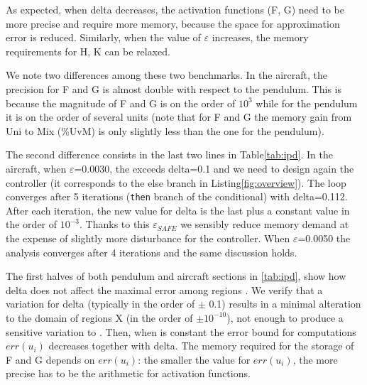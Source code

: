 
As expected, when delta decreases, the activation functions (F, G) need to be
more precise and require more memory, because the space for approximation error
is reduced. Similarly, when the value of $\varepsilon$ increases, the memory
requirements for H, K can be relaxed.

We note two differences among these two benchmarks.
In the aircraft,
the precision for F and G is almost double with respect to the pendulum. This is
because the magnitude of F and G is on the order of $10^{3}$ while for the
pendulum it is on the order of several units (note that for F and G the memory gain
from Uni to Mix (\%UvM) is only slightly less than the one for the pendulum).

The second difference consists in the last two lines in Table\ref{tab:ipd}.
In the aircraft, when $\varepsilon$=0.0030, the \maxUij exceeds delta=0.1 and we
need to design again the controller (it corresponds to the else branch in
Listing\ref{fig:overview}). The loop converges after 5 iterations (\texttt{then}
branch of the conditional) with delta=0.112. After each iteration, the new value
for delta is the last \maxUij\space plus a constant value in the order of
$10^{-3}$. Thanks to this $\varepsilon_{SAFE}$ we sensibly reduce memory demand
at the expense of slightly more disturbance for the controller. When
$\varepsilon$=0.0050 the analysis converges after 4 iterations and the same
discussion holds.


The first halves of both pendulum and aircraft sections in \autoref{tab:ipd}, show how delta does not affect the maximal error among regions \maxUij. We verify that a variation for delta (typically in the order of $\pm$ 0.1) results in a minimal alteration to the domain of regions X (in the order of $\pm 10^{-10}$), not enough to produce a sensitive variation to \maxUij. Then, when \maxUij\space is constant the error bound for computations $err(u_{i})$ decreases together with delta. The memory required for the storage of F and G depends on $err(u_{i})$: the smaller the value for $err(u_{i})$, the more precise has to be the arithmetic for activation functions. 

